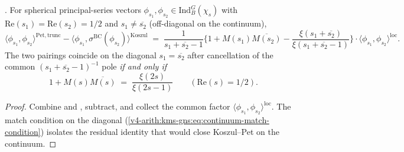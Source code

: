 \begin{theorem}
\label{v4-arith:kms-gns:thm:eisenstein-discrepancy}
\ClaimStatusProvedHere. For spherical principal-series vectors
\(\phi_{s_{1}},\phi_{s_{2}}\in\mathrm{Ind}_{B}^{G}(\chi_{s})\) with
\(\mathrm{Re}(s_{1})=\mathrm{Re}(s_{2})=1/2\) and
\(s_{1}\neq\overline{s_{2}}\) (off-diagonal on the continuum),
\begin{equation}
\label{v4-arith:kms-gns:eq:continuum-discrepancy}
\bigl\langle\phi_{s_{1}},\phi_{s_{2}}\bigr\rangle^{\mathrm{Pet},\mathrm{trunc}}-\bigl\langle\phi_{s_{1}},\sigma^{\mathrm{BC}}(\phi_{s_{2}})\bigr\rangle^{\mathrm{Koszul}}\;=\;\frac{1}{s_{1}+\overline{s_{2}}-1}\bigl\{1+M(s_{1})\overline{M(s_{2})}-\frac{\xi(s_{1}+\overline{s_{2}})}{\xi(s_{1}+\overline{s_{2}}-1)}\bigr\}\cdot\langle\phi_{s_{1}},\phi_{s_{2}}\rangle^{\mathrm{loc}}.
\end{equation}
The two pairings coincide on the diagonal
\(s_{1}=\overline{s_{2}}\) after cancellation of the common
\((s_{1}+\overline{s_{2}}-1)^{-1}\) pole \emph{if and only if}
\begin{equation}
\label{v4-arith:kms-gns:eq:continuum-match-condition}
1+M(s)\overline{M(s)}\;=\;\frac{\xi(2s)}{\xi(2s-1)}\qquad(\mathrm{Re}(s)=1/2).
\end{equation}
\end{theorem}

\begin{proof}
Combine  and
, subtract, and collect
the common factor \(\langle\phi_{s_{1}},\phi_{s_{2}}\rangle^{\mathrm{loc}}\).
The match condition on the diagonal
(\ref{v4-arith:kms-gns:eq:continuum-match-condition}) isolates
the residual identity that would close Koszul--Pet on the
continuum.
\end{proof}

